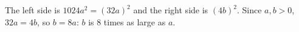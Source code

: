 The left side is $1024a^2=(32a)^2$ and the right side is $(4b)^2$. Since $a,b>0$, $32a=4b$, so $b=8a$: $b$ is $\boxed{8}$ times as large as $a$.
